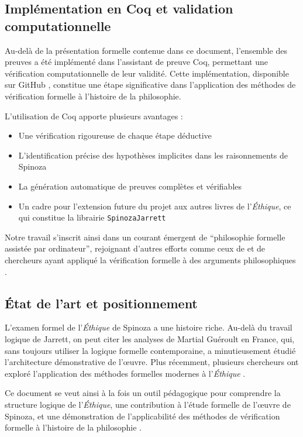 \documentclass[10pt,a3paper]{article}
\begin{document}
\subsection{Implémentation en Coq et validation computationnelle}

Au-delà de la présentation formelle contenue dans ce document, l'ensemble des preuves a été implémenté dans l'assistant de preuve Coq, permettant une vérification computationnelle de leur validité. Cette implémentation, disponible sur GitHub \cite{pommeret2025github}, constitue une étape significative dans l'application des méthodes de vérification formelle à l'histoire de la philosophie.

L'utilisation de Coq apporte plusieurs avantages :
\begin{itemize}
    \item Une vérification rigoureuse de chaque étape déductive
    \item L'identification précise des hypothèses implicites dans les raisonnements de Spinoza
    \item La génération automatique de preuves complètes et vérifiables
    \item Un cadre pour l'extension future du projet aux autres livres de l'\textit{Éthique}, ce qui constitue la librairie \texttt{SpinozaJarrett}
\end{itemize}

Notre travail s'inscrit ainsi dans un courant émergent de ``philosophie formelle assistée par ordinateur'', rejoignant d'autres efforts comme ceux de \cite{meles2019pratique} et de chercheurs ayant appliqué la vérification formelle à des arguments philosophiques \cite{bentzen2021computational}.

\subsection{État de l'art et positionnement}

L'examen formel de l'\textit{Éthique} de Spinoza a une histoire riche. Au-delà du travail logique de Jarrett, on peut citer les analyses de Martial Guéroult \cite{gueroult1968spinoza} en France, qui, sans toujours utiliser la logique formelle contemporaine, a minutieusement étudié l'architecture démonstrative de l'œuvre. Plus récemment, plusieurs chercheurs ont exploré l'application des méthodes formelles modernes à l'\textit{Éthique} \cite{seni2018github}.

Ce document se veut ainsi à la fois un outil pédagogique pour comprendre la structure logique de l'\textit{Éthique}, une contribution à l'étude formelle de l'œuvre de Spinoza, et une démonstration de l'applicabilité des méthodes de vérification formelle à l'histoire de la philosophie \cite{coquand1988calculus}.
\end{document}

